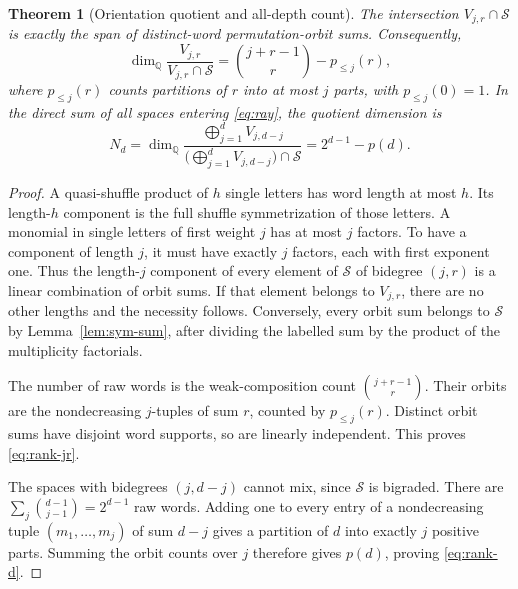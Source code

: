 \documentclass[11pt]{article}
\numberwithin{equation}{section}
\newtheorem{theorem}{Theorem}[section]
\theoremstyle{definition}
\newcommand{\SSS}{\mathscr S}
\begin{document}
\begin{theorem}[Orientation quotient and all-depth count]\label{thm:rank}
The intersection $V_{j,r}\cap\SSS$ is exactly the span of distinct-word
permutation-orbit sums. Consequently,
\begin{equation}\label{eq:rank-jr}
 \dim_{\mathbb Q}\frac{V_{j,r}}{V_{j,r}\cap\SSS}
       =\binom{j+r-1}{r}-p_{\le j}(r),
\end{equation}
where $p_{\le j}(r)$ counts partitions of $r$ into at most $j$ parts,
with $p_{\le j}(0)=1$. In the direct sum of all spaces entering
\eqref{eq:ray}, the quotient dimension is
\begin{equation}\label{eq:rank-d}
 \boxed{\displaystyle
 N_d=\dim_{\mathbb Q}
 \frac{\bigoplus_{j=1}^d V_{j,d-j}}
      {\bigl(\bigoplus_{j=1}^d V_{j,d-j}\bigr)\cap\SSS}
      =2^{d-1}-p(d).}
\end{equation}
\end{theorem}
\begin{proof}
A quasi-shuffle product of $h$ single letters has word length at most
$h$. Its length-$h$ component is the full shuffle symmetrization of those
letters. A monomial in single letters of first weight $j$ has at most
$j$ factors. To have a component of length $j$, it must have exactly
$j$ factors, each with first exponent one. Thus the length-$j$
component of every element of $\SSS$ of bidegree $(j,r)$ is a linear
combination of orbit sums. If that element belongs to $V_{j,r}$, there
are no other lengths and the necessity follows. Conversely, every orbit
sum belongs to $\SSS$ by Lemma~\ref{lem:sym-sum}, after dividing the
labelled sum by the product of the multiplicity factorials.

The number of raw words is the weak-composition count
$\binom{j+r-1}{r}$. Their orbits are the nondecreasing $j$-tuples of sum
$r$, counted by $p_{\le j}(r)$. Distinct orbit sums have disjoint word
supports, so are linearly independent. This proves \eqref{eq:rank-jr}.

The spaces with bidegrees $(j,d-j)$ cannot mix, since $\SSS$ is
bigraded. There are $\sum_j\binom{d-1}{j-1}=2^{d-1}$ raw words.
Adding one to every entry of a nondecreasing tuple $(m_1,\ldots,m_j)$
of sum $d-j$ gives a partition of $d$ into exactly $j$ positive parts.
Summing the orbit counts over $j$ therefore gives $p(d)$, proving
\eqref{eq:rank-d}.
\end{proof}
\end{document}
